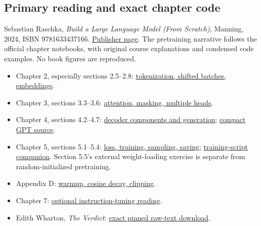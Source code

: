 \documentclass[11pt]{article}
\newcommand{\bookrepo}{https://github.com/rasbt/LLMs-from-scratch/blob/f49cad747931fe6af0a7d2802cd480d1c1a0ec8e}
\newcommand{\booklink}[2]{\href{\bookrepo/#1}{#2}}
\begin{document}
\subsection*{Primary reading and exact chapter code}
Sebastian Raschka, \emph{Build a Large Language Model (From Scratch)}, Manning,
2024, ISBN 9781633437166.
\href{https://www.manning.com/books/build-a-large-language-model-from-scratch}{Publisher page}.
The pretraining narrative follows the official chapter notebooks, with original
course explanations and condensed code examples. No book figures are reproduced.
\begin{itemize}
\item Chapter 2, especially sections 2.5--2.8:
\booklink{ch02/01_main-chapter-code/ch02.ipynb}{tokenization, shifted batches, embeddings}.
\item Chapter 3, sections 3.3--3.6:
\booklink{ch03/01_main-chapter-code/ch03.ipynb}{attention, masking, multiple heads}.
\item Chapter 4, sections 4.2--4.7:
\booklink{ch04/01_main-chapter-code/ch04.ipynb}{decoder components and generation};
\booklink{ch04/01_main-chapter-code/gpt.py}{compact GPT source}.
\item Chapter 5, sections 5.1--5.4:
\booklink{ch05/01_main-chapter-code/ch05.ipynb}{loss, training, sampling, saving};
\booklink{ch05/01_main-chapter-code/gpt_train.py}{training-script companion}.
Section 5.5's external weight-loading exercise is separate from random-initialized pretraining.
\item Appendix D:
\booklink{appendix-D/01_main-chapter-code/appendix-D.ipynb}{warmup, cosine decay, clipping}.
\item Chapter 7:
\booklink{ch07/01_main-chapter-code/ch07.ipynb}{optional instruction-tuning reading}.
\item Edith Wharton, \emph{The Verdict}:
\href{https://raw.githubusercontent.com/rasbt/LLMs-from-scratch/f49cad747931fe6af0a7d2802cd480d1c1a0ec8e/ch02/01_main-chapter-code/the-verdict.txt}{exact pinned raw-text download}.
\end{itemize}
\end{document}
